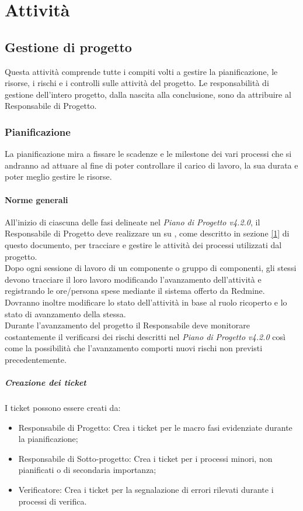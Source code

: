 \section{Attività}


\subsection{Gestione di progetto}
Questa attività comprende tutte i compiti volti a gestire la pianificazione, le risorse, i rischi e i controlli sulle attività del progetto.
Le responsabilità di gestione dell’intero progetto, dalla nascita alla conclusione, sono da attribuire al Responsabile di Progetto.

\subsubsection{Pianificazione}
La pianificazione mira a fissare le scadenze e le milestone dei vari processi che si andranno ad attuare al fine di poter controllare il carico di lavoro, la sua durata e poter meglio gestire le risorse.

\paragraph{Norme generali}
All'inizio di ciascuna delle fasi delineate nel \emph{Piano di Progetto v4.2.0}, il Responsabile di Progetto deve realizzare un  su , come descritto in sezione \ref{1} di questo documento, per tracciare e gestire le attività dei processi utilizzati dal progetto.\\
Dopo ogni sessione di lavoro di un componente o gruppo di componenti, gli stessi devono tracciare il loro lavoro modificando l'avanzamento dell'attività e registrando le ore/persona spese mediante il sistema offerto da Redmine.
Dovranno inoltre modificare lo stato dell'attività in base al ruolo ricoperto e lo stato di avanzamento della stessa.\\
Durante l'avanzamento del progetto il Responsabile  deve monitorare costantemente il verificarsi dei rischi descritti nel \emph{Piano di Progetto v4.2.0} così come la possibilità che l'avanzamento comporti nuovi rischi non previsti precedentemente.

\subparagraph{Creazione dei ticket}
I ticket possono essere creati da:
\begin{itemize}
\item Responsabile di Progetto: Crea i ticket per le macro fasi evidenziate durante la pianificazione;
\item Responsabile di Sotto-progetto: Crea i ticket per i processi minori, non pianificati o di secondaria importanza;
\item Verificatore: Crea i ticket per la segnalazione di errori rilevati durante i processi di verifica.
\end{itemize}

